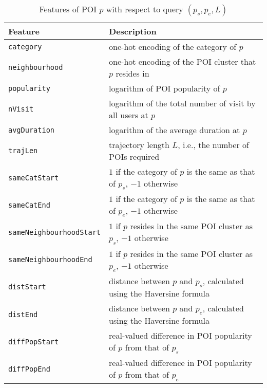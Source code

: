 \documentclass[9pt]{extarticle}
\DeclareMathOperator*{\argmax}{argmax}
\begin{document}


\begin{table*}[ht]
\caption{Features of POI $p$ with respect to query $(p_s, p_e, L)$}
\label{tab:poifeature}
\centering
\setlength{\tabcolsep}{10pt} %
\begin{tabular}{l|l} \hline
\textbf{Feature}  & \textbf{Description} \\ \hline
\texttt{category}               & one-hot encoding of the category of $p$ \\
\texttt{neighbourhood}          & one-hot encoding of the POI cluster that $p$ resides in \\
\texttt{popularity}             & logarithm of POI popularity of $p$ \\
\texttt{nVisit}                 & logarithm of the total number of visit by all users at $p$ \\
\texttt{avgDuration}            & logarithm of the average duration at $p$ \\ \hline
\texttt{trajLen}                & trajectory length $L$, i.e., the number of POIs required \\
\texttt{sameCatStart}           & $1$ if the category of $p$ is the same as that of $p_s$, $-1$ otherwise \\
\texttt{sameCatEnd}             & $1$ if the category of $p$ is the same as that of $p_e$, $-1$ otherwise \\
\texttt{sameNeighbourhoodStart} & $1$ if $p$ resides in the same POI cluster as $p_s$, $-1$ otherwise \\
\texttt{sameNeighbourhoodEnd}   & $1$ if $p$ resides in the same POI cluster as $p_e$, $-1$ otherwise \\
\texttt{distStart}              & distance between $p$ and $p_s$, calculated using the Haversine formula \\
\texttt{distEnd}                & distance between $p$ and $p_e$, calculated using the Haversine formula \\
\texttt{diffPopStart}           & real-valued difference in POI popularity of $p$ from that of $p_s$ \\
\texttt{diffPopEnd}             & real-valued difference in POI popularity of $p$ from that of $p_e$ \\

\end{tabular}
\end{table*}
\end{document}
